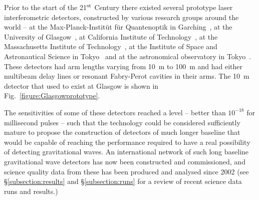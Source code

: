 \documentclass{article}
\begin{document}
Prior to the start of the 21$^{\rm st}$ Century there existed several prototype
laser interferometric detectors, constructed by various research groups around
the world -- at the Max-Planck-Instit\"ut f\"ur Quantenoptik in
Garching~\cite{Shoemaker}, at the University of Glasgow~\cite{Robertson}, at
California Institute of Technology~\cite{Abramovici}, at the Massachusetts
Institute of Technology~\cite{Fritschel2}, at the Institute of Space and
Astronautical Science in Tokyo~\cite{Mizuno} and at the astronomical observatory
in Tokyo~\cite{Araya}. These detectors had arm lengths varying from 10~m to
100~m and had either multibeam delay lines or resonant Fabry-Perot cavities in
their arms.  The 10~m detector that used to exist at Glasgow is shown in
Fig.~\ref{figure:Glasgowprototype}.


The sensitivities of some of these detectors reached a level -- better than
$10^{-18}$ for millisecond pulses -- such that the technology could be
considered sufficiently mature to propose the construction of detectors of much
longer baseline that would be capable of reaching the performance required to
have a real possibility of detecting gravitational waves.  An international
network of such long baseline gravitational wave detectors has now been
constructed and commissioned, and science quality data from these has been
produced and analysed since 2002 (see \S\ref{subsection:results} and
\S\ref{subsection:runs} for a review of recent science data runs and results.)
\end{document}
